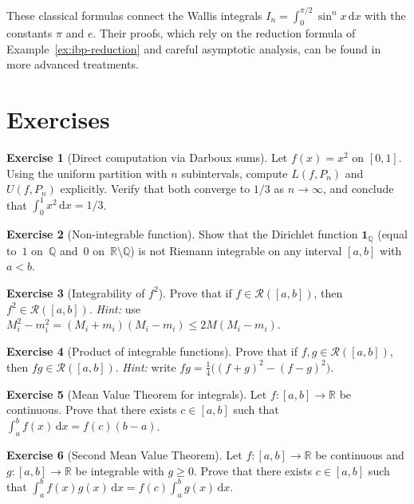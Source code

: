 \documentclass[12pt,a4paper]{book}
\theoremstyle{definition}
\newtheorem{exercise}{Exercise}[chapter]
\newcommand{\Q}{\mathbb{Q}}
\newcommand{\R}{\mathbb{R}}
\newcommand{\dd}{\,\mathrm{d}}
\begin{document}
These classical formulas connect the Wallis integrals $I_n=\int_0^{\pi/2}\sin^n x\dd x$
with the constants $\pi$ and $e$.  Their proofs, which rely on the
reduction formula of Example~\ref{ex:ibp-reduction} and careful
asymptotic analysis, can be found in more advanced treatments.


\section{Exercises}\label{sec:exer-ch7}

\begin{exercise}[Direct computation via Darboux sums]\label{exo:exer-darboux-direct}
  Let $f(x)=x^2$ on $[0,1]$.  Using the uniform partition with $n$
  subintervals, compute $L(f,P_n)$ and $U(f,P_n)$ explicitly.  Verify
  that both converge to $1/3$ as $n\to\infty$, and conclude that
  $\int_0^1 x^2\dd x=1/3$.
\end{exercise}

\begin{exercise}[Non-integrable function]\label{exo:exer-dirichlet}
  Show that the Dirichlet function $\mathbf{1}_\Q$ (equal to~$1$ on~$\Q$
  and~$0$ on~$\R\setminus\Q$) is not Riemann integrable on any interval
  $[a,b]$ with $a<b$.
\end{exercise}

\begin{exercise}[Integrability of $f^2$]\label{exo:exer-f-squared}
  Prove that if $f\in\mathcal{R}([a,b])$, then
  $f^2\in\mathcal{R}([a,b])$.
  \emph{Hint:} use $M_i^2-m_i^2=(M_i+m_i)(M_i-m_i)\le 2M(M_i-m_i)$.
\end{exercise}

\begin{exercise}[Product of integrable functions]\label{exo:exer-product}
  Prove that if $f,g\in\mathcal{R}([a,b])$, then
  $fg\in\mathcal{R}([a,b])$.
  \emph{Hint:} write $fg=\tfrac{1}{4}\bigl((f+g)^2-(f-g)^2\bigr)$.
\end{exercise}

\begin{exercise}[Mean Value Theorem for integrals]\label{exo:exer-MVT-int}
  Let $f\colon[a,b]\to\R$ be continuous.  Prove that there exists
  $c\in[a,b]$ such that
  $\displaystyle\int_a^b f(x)\dd x = f(c)(b-a)$.
\end{exercise}

\begin{exercise}[Second Mean Value Theorem]\label{exo:exer-second-MVT}
  Let $f\colon[a,b]\to\R$ be continuous and $g\colon[a,b]\to\R$ be
  integrable with $g\ge0$.  Prove that there exists $c\in[a,b]$ such
  that $\displaystyle\int_a^b f(x)g(x)\dd x = f(c)\int_a^b g(x)\dd x$.
\end{exercise}
\end{document}

